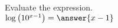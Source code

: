 \documentclass{ximera}
\author{David Kish}
\begin{document}
\begin{exercise}
Evaluate the expression.\\
$\log \left(10^{x-1}\right)= \answer{x-1}$
\end{exercise}
\end{document}
